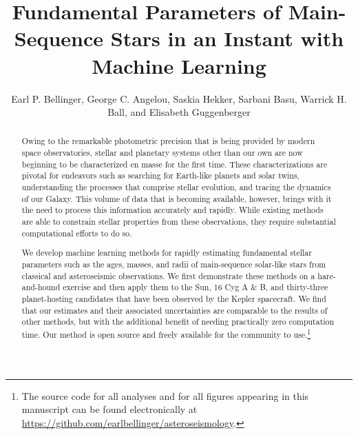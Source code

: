 \documentclass[iop,apj,twocolappendix]{emulateapj}
\begin{document}
\title{Fundamental Parameters of Main-Sequence Stars in an Instant with Machine Learning}

\author{Earl P. Bellinger, George C. Angelou, Saskia Hekker, Sarbani Basu, Warrick H. Ball, and Elisabeth Guggenberger}

\begin{abstract}
Owing to the remarkable photometric precision that is being provided by modern space observatories, stellar and planetary systems other than our own are now beginning to be characterized en masse for the first time. These characterizations are pivotal for endeavors such as searching for Earth-like planets and solar twins, understanding the processes that comprise stellar evolution, and tracing the dynamics of our Galaxy. This volume of data that is becoming available, however, brings with it the need to process this information accurately and rapidly. While existing methods are able to constrain stellar properties from these observations, they require substantial computational efforts to do so. 

We develop machine learning methods for rapidly estimating fundamental stellar parameters such as the ages, masses, and radii of main-sequence solar-like stars from classical and asteroseismic observations. We first demonstrate these methods on a hare-and-hound exercise and then apply them to the Sun, 16 Cyg A \& B, and thirty-three planet-hosting candidates that have been observed by the Kepler spacecraft. We find that our estimates and their associated uncertainties are comparable to the results of other methods, but with the additional benefit of needing practically zero computation time. Our method is open source and freely available for the community to use.\footnote{The source code for all analyses and for all figures appearing in this manuscript can be found electronically at \url{https://github.com/earlbellinger/asteroseismology}.}
\end{abstract}
\end{document}
